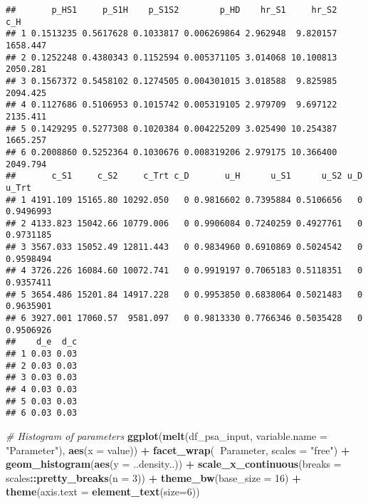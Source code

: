 \documentclass[
]{article}
\newenvironment{Shaded}{\begin{snugshade}}{\end{snugshade}}
\newcommand{\CommentTok}[1]{\textcolor[rgb]{0.56,0.35,0.01}{\textit{#1}}}
\newcommand{\DataTypeTok}[1]{\textcolor[rgb]{0.13,0.29,0.53}{#1}}
\newcommand{\DecValTok}[1]{\textcolor[rgb]{0.00,0.00,0.81}{#1}}
\newcommand{\KeywordTok}[1]{\textcolor[rgb]{0.13,0.29,0.53}{\textbf{#1}}}
\newcommand{\NormalTok}[1]{#1}
\newcommand{\OperatorTok}[1]{\textcolor[rgb]{0.81,0.36,0.00}{\textbf{#1}}}
\newcommand{\StringTok}[1]{\textcolor[rgb]{0.31,0.60,0.02}{#1}}
\begin{document}
\begin{verbatim}
##       p_HS1     p_S1H    p_S1S2        p_HD    hr_S1     hr_S2      c_H
## 1 0.1513235 0.5617628 0.1033817 0.006269864 2.962948  9.820157 1658.447
## 2 0.1252248 0.4380343 0.1152594 0.005371105 3.014068 10.100813 2050.281
## 3 0.1567372 0.5458102 0.1274505 0.004301015 3.018588  9.825985 2094.425
## 4 0.1127686 0.5106953 0.1015742 0.005319105 2.979709  9.697122 2135.411
## 5 0.1429295 0.5277308 0.1020384 0.004225209 3.025490 10.254387 1665.257
## 6 0.2008860 0.5252364 0.1030676 0.008319206 2.979175 10.366400 2049.794
##       c_S1     c_S2     c_Trt c_D       u_H      u_S1      u_S2 u_D     u_Trt
## 1 4191.109 15165.80 10292.050   0 0.9816602 0.7395884 0.5106656   0 0.9496993
## 2 4133.823 15042.66 10779.006   0 0.9906084 0.7240259 0.4927761   0 0.9731185
## 3 3567.033 15052.49 12811.443   0 0.9834960 0.6910869 0.5024542   0 0.9598494
## 4 3726.226 16084.60 10072.741   0 0.9919197 0.7065183 0.5118351   0 0.9357411
## 5 3654.486 15201.84 14917.228   0 0.9953850 0.6838064 0.5021483   0 0.9635901
## 6 3927.001 17060.57  9581.097   0 0.9813330 0.7766346 0.5035428   0 0.9506926
##    d_e  d_c
## 1 0.03 0.03
## 2 0.03 0.03
## 3 0.03 0.03
## 4 0.03 0.03
## 5 0.03 0.03
## 6 0.03 0.03
\end{verbatim}

\begin{Shaded}
\begin{Highlighting}[]
\CommentTok{# Histogram of parameters}
\KeywordTok{ggplot}\NormalTok{(}\KeywordTok{melt}\NormalTok{(df_psa_input, }\DataTypeTok{variable.name =} \StringTok{"Parameter"}\NormalTok{), }\KeywordTok{aes}\NormalTok{(}\DataTypeTok{x =}\NormalTok{ value)) }\OperatorTok{+}
\StringTok{       }\KeywordTok{facet_wrap}\NormalTok{(}\OperatorTok{~}\NormalTok{Parameter, }\DataTypeTok{scales =} \StringTok{"free"}\NormalTok{) }\OperatorTok{+}
\StringTok{       }\KeywordTok{geom_histogram}\NormalTok{(}\KeywordTok{aes}\NormalTok{(}\DataTypeTok{y =}\NormalTok{ ..density..)) }\OperatorTok{+}
\StringTok{       }\KeywordTok{scale_x_continuous}\NormalTok{(}\DataTypeTok{breaks =}\NormalTok{ scales}\OperatorTok{::}\KeywordTok{pretty_breaks}\NormalTok{(}\DataTypeTok{n =} \DecValTok{3}\NormalTok{)) }\OperatorTok{+}\StringTok{ }
\StringTok{       }\KeywordTok{theme_bw}\NormalTok{(}\DataTypeTok{base_size =} \DecValTok{16}\NormalTok{) }\OperatorTok{+}\StringTok{ }
\StringTok{       }\KeywordTok{theme}\NormalTok{(}\DataTypeTok{axis.text =} \KeywordTok{element_text}\NormalTok{(}\DataTypeTok{size=}\DecValTok{6}\NormalTok{)) }
\end{Highlighting}
\end{Shaded}
\end{document}
